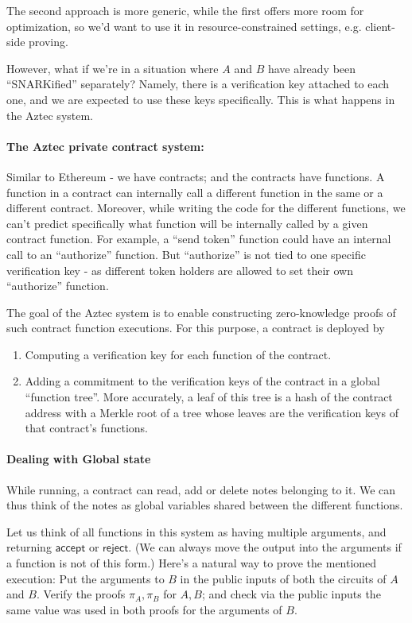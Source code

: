 \documentclass[11pt]{article} %
\newcommand{\rej}{\ensuremath{\mathsf{reject}}\xspace}
\newcommand{\acc}{\ensuremath{\mathsf{accept}}\xspace}
\newcommand{\prf}{\ensuremath{\mathsf{\pi}}\xspace}
\begin{document}
The second approach is more generic, while the first offers more room for optimization, so we'd want to use it in resource-constrained settings, e.g. client-side proving.


However, what if we're in a situation where $A$ and $B$ have already been ``SNARKified'' separately?
Namely, there is a verification key attached to each one, and we are expected to use these keys specifically.
This is what happens in the Aztec system.
\paragraph{The Aztec private contract system:}
 Similar to Ethereum - we have contracts; and the contracts have functions.
A function in a contract can internally call a different function in the same or a different contract. Moreover, while writing the code for the different functions,
we can't predict specifically what function will be internally called by a given contract function. For example, a ``send token'' function could have an internal call to an ``authorize'' function.
But ``authorize'' is not tied to one specific verification key - as different token holders are allowed to set their own ``authorize'' function.


The goal of the Aztec system is to enable constructing zero-knowledge proofs of such contract function executions.
For this purpose, a contract is deployed by 
\begin{enumerate}
\item  Computing a verification key for each function of the contract.
\item Adding a commitment to the verification keys of the contract in a global ``function tree''. More accurately, a leaf of this tree is a hash of the
contract address with a Merkle root of a tree whose leaves are the verification keys of that contract's functions.

\end{enumerate}

\paragraph{Dealing with Global state}
While running, a contract can read, add or delete notes belonging to it.
We can thus think of the notes as global variables shared between the different functions.




Let us think of all functions in this system as having multiple arguments, and returning \acc or \rej. (We can always move the output into the arguments if a function is not of this form.)
Here's a natural way to prove the mentioned execution: Put the arguments to $B$ in the public inputs of both the circuits of $A$ and $B$.
Verify the proofs $\prf_A,\prf_B$ for $A,B$; and check via the public inputs the same value was used in both proofs for the arguments of $B$.
\end{document}
